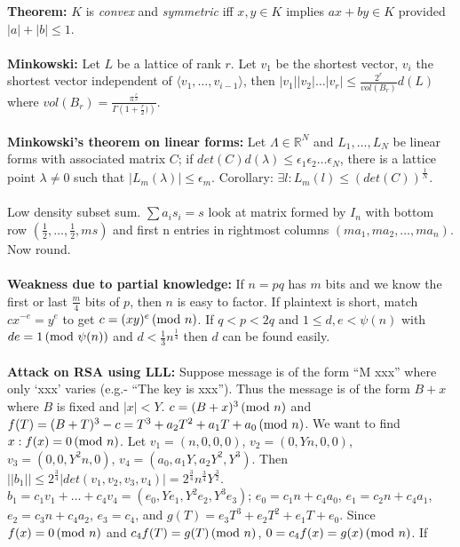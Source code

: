 {\bf Theorem: }
$K$ is \emph{convex} and \emph{symmetric} iff $x, y \in K$
implies
$ax+by \in K$ provided $|a| + |b| \leq 1$.
\\
\\
{\bf Minkowski: } Let $L$ be a lattice of rank $r$.  Let $v_1$ be the shortest
vector,
$v_i$ the shortest vector independent of $\langle v_1, \ldots , v_{i-1} \rangle$, then
$|v_1 | |v_2 | \ldots |v_r | \leq {\frac {2^r} {vol(B_r)}} d(L)$ where
$vol(B_r)= {\frac {\pi^{\frac r 2}} {\Gamma(1+{\frac r 2)})}}$.
\\
\\
{\bf Minkowski's theorem on linear forms: }  Let $\Lambda \in
{\mathbb R}^N$ and $L_1, \ldots , L_N$ be linear forms with associated
matrix $C$;
if $det(C)d(\lambda) \leq \epsilon_1 \epsilon_2 \ldots \epsilon_N$,
there is a lattice point $\lambda \ne 0$ such that
$|L_m (\lambda)| \leq \epsilon_m$.   Corollary: $\exists l: L_m(l)
\leq (det(C))^{\frac 1 N}$.  \\
\\
Low density subset sum. $\sum a_i s_i = s$ look at matrix
formed by $I_n$
with bottom row $(\frac {1} {2} , \ldots , \frac {1} {2} , ms)$ and
first n entries in rightmost columns $(m a_1 , m a_2 , \ldots , m a_n )$.
Now round.
\\
\\
{\bf Weakness due to partial knowledge: }
If $n=pq$ has $m$ bits and we know the first or last ${\frac m 4}$ bits of $p$, then
$n$ is easy to factor.  If plaintext is short, match $c x^{-e} = y^e$ to get
$c=(xy)^e \thinspace \textnormal{(mod } n \textnormal{)}$.  If $q<p<2q$ and $1 \le d, e < \psi(n)$ with $de=1 \thinspace \textnormal{(mod } \psi(n) \textnormal{)}$ and
$d<{\frac 1 3} n^{\frac 1 4}$ then $d$ can be found easily.
\\
\\
{\bf Attack on RSA using LLL: }
 Suppose message is of the form ``M xxx'' where only `xxx' varies
(e.g.- ``The key is xxx'').  Thus the message is of the form $B+x$ where $B$ is fixed and
$|x|<Y$.  $c= (B+x)^3 \thinspace \textnormal{(mod } n \textnormal{)}$ and 
$f(T)= (B+T)^3-c= T^3+ a_2 T^2 + a_1 T + a_0 \thinspace \textnormal{(mod } n \textnormal{)}$. We 
want to find $x: f(x)=0 \thinspace \textnormal{(mod } n \textnormal{)}$.  Let
$v_1= (n, 0, 0, 0)$, $v_2= (0, Yn, 0, 0)$, $v_3= (0, 0, Y^2n, 0)$,
$v_4= (a_0 , a_1 Y, a_2Y^2, Y^3)$.  Then 
$||b_1|| \le 
2^{\frac 3 4} |det(v_1, v_2, v_3, v_4)| = 2^{\frac 3 4}n^{\frac 3 4} Y^{\frac 3 2}$.
$b_1= c_1 v_1 + \ldots + c_4 v_4= (e_0 , Y e_1 , Y^2 e_2, Y^3 e_3)$;
$e_0 = c_1 n + c_4 a_0$, $e_1 = c_2 n + c_4 a_1$,
$e_2 = c_3 n + c_4 a_2$,
$e_3 =  c_4$, and $g(T)= e_3 T^3 + e_2 T^2  + e_1 T +e_0$.  Since $f(x)= 0 \thinspace \textnormal{(mod } n \textnormal{)}$
and $c_4 f(T)= g(T) \thinspace \textnormal{(mod } n \textnormal{)}$, $0=c_4 f(x) = g(x) \thinspace \textnormal{(mod } n \textnormal{)}$.  If
